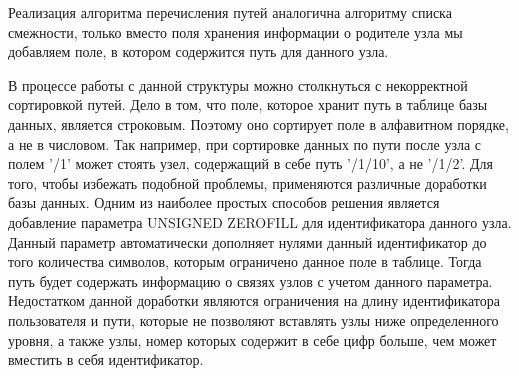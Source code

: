 \documentclass[a4paper,14pt]{extreport}
\theoremstyle{definition}
\begin{document}
Реализация алгоритма перечисления путей аналогична алгоритму списка смежности, только вместо поля хранения информации о родителе узла мы добавляем поле, в котором содержится путь для данного узла.

\begin{table}[H]
\end{table}
В процессе работы с данной структуры можно столкнуться с некорректной сортировкой путей\cite{Karwin}. Дело в том, что поле, которое хранит путь в таблице базы данных, является строковым. Поэтому оно сортирует поле в алфавитном порядке, а не в числовом. Так например, при сортировке данных по пути после узла с полем '/1' может стоять узел, содержащий в себе путь '/1/10', а не '/1/2'. Для того, чтобы избежать подобной проблемы, применяются различные доработки базы данных. Одним из наиболее простых способов решения является добавление параметра UNSIGNED ZEROFILL  для идентификатора данного узла. Данный параметр автоматически дополняет нулями данный идентификатор до того количества символов, которым ограничено данное поле в таблице. Тогда путь будет содержать информацию о связях узлов с учетом данного параметра. Недостатком данной доработки являются ограничения на длину идентификатора пользователя и пути, которые не позволяют вставлять узлы ниже определенного уровня, а также узлы, номер которых содержит в себе цифр больше, чем может вместить в себя идентификатор.
\end{document}
